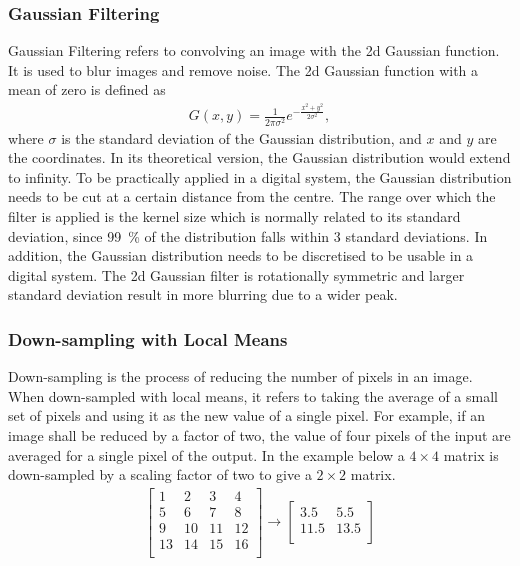 \subsubsection{Gaussian Filtering} \label{sec:t_gauss}
Gaussian Filtering refers to convolving an image with the \gls{2d} Gaussian function. It is used to blur images and remove noise. The \gls{2d} Gaussian function with a mean of zero is defined as
\begin{align}
    G(x,y) = \frac{1}{2\pi \sigma^{2}}e^{-\frac{x^2+y^2}{2\sigma^2}}, \label{eq:gauss_2d}
\end{align}
where $\sigma$ is the standard deviation of the Gaussian distribution, and $x$ and $y$ are the coordinates.
In its theoretical version, the Gaussian distribution would extend to infinity. To be practically applied in a digital system, the Gaussian distribution needs to be cut at a certain distance from the centre. The range over which the filter is applied is the kernel size which is normally related to its standard deviation, since \SI{99}{\percent} of the distribution falls within 3 standard deviations. In addition, the Gaussian distribution needs to be discretised to be usable in a digital system. The \gls{2d} Gaussian filter is rotationally symmetric and larger standard deviation result in more blurring due to a wider peak.

\subsubsection{Down-sampling with Local Means} \label{sec:t_downsample}
Down-sampling is the process of reducing the number of pixels in an image. When down-sampled with local means, it refers to taking the average of a small set of pixels and using it as the new value of a single pixel. For example, if an image shall be reduced by a factor of two, the value of four pixels of the input are averaged for a single pixel of the output. In the example below a $4\times4$ matrix is down-sampled by a scaling factor of two to give a $2\times2$ matrix.
\begin{align*}
    \begin{bmatrix}
        1  & 2  & 3  & 4\\
        5  & 6  & 7  & 8\\
        9  & 10 & 11 & 12\\
        13 & 14 & 15 & 16\\
    \end{bmatrix} 
    \rightarrow 
    \begin{bmatrix}
        3.5  & 5.5\\
        11.5 & 13.5\\ 
    \end{bmatrix}
\end{align*}
